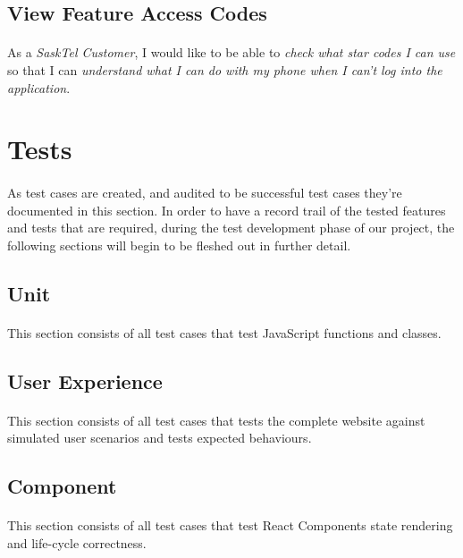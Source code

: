 \documentclass[12pt]{article}
\begin{document}
\subsection{View Feature Access Codes}
\paragraph{}	As a \textit{SaskTel Customer}, I would like to be able to \textit{check what star codes I can use} so that I can \textit{understand what I can do with my phone when I can't log into the application}.

\newpage
\section{Tests}
\paragraph{}	As test cases are created, and audited to be successful test cases they're documented in this section. In order to have a record trail of the tested features and tests that are required, during the test development phase of our project, the following sections will begin to be fleshed out in further detail.

\subsection{Unit}
\paragraph{}	This section consists of all test cases that test JavaScript functions and classes.

\subsection{User Experience} 
\paragraph{}	This section consists of all test cases that tests the complete website against simulated user scenarios and tests expected behaviours.

\subsection{Component}
\paragraph{}	This section consists of all test cases that test React Components state rendering and life-cycle correctness.
\end{document}

